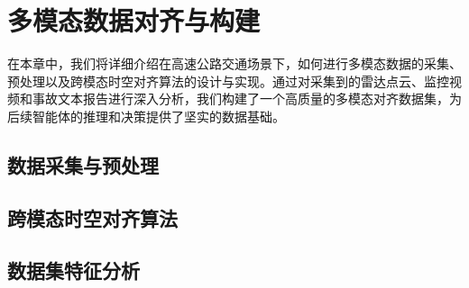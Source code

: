 \chapter{多模态数据对齐与构建}

在本章中，我们将详细介绍在高速公路交通场景下，如何进行多模态数据的采集、预处理以及跨模态时空对齐算法的设计与实现。通过对采集到的雷达点云、监控视频和事故文本报告进行深入分析，我们构建了一个高质量的多模态对齐数据集，为后续智能体的推理和决策提供了坚实的数据基础。

\section{数据采集与预处理}

\section{跨模态时空对齐算法}

\section{数据集特征分析}
